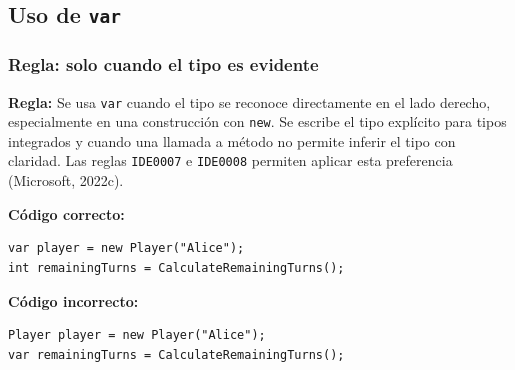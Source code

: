 \subsection{Uso de \texttt{var}}

\subsubsection{Regla: solo cuando el tipo es evidente}

\textbf{Regla:} Se usa \texttt{var} cuando el tipo se reconoce directamente en el lado derecho, especialmente en una construcción con \texttt{new}. Se escribe el tipo explícito para tipos integrados y cuando una llamada a método no permite inferir el tipo con claridad. Las reglas \texttt{IDE0007} e \texttt{IDE0008} permiten aplicar esta preferencia (Microsoft, 2022c).

\textbf{Código correcto:}
\begin{lstlisting}[style=csharpstyle]
var player = new Player("Alice");
int remainingTurns = CalculateRemainingTurns();
\end{lstlisting}

\textbf{Código incorrecto:}
\begin{lstlisting}[style=csharpstyle]
Player player = new Player("Alice");
var remainingTurns = CalculateRemainingTurns();
\end{lstlisting}
